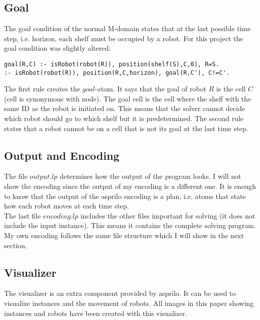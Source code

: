 \documentclass[runningheads]{llncs}
\begin{document}
\subsection{Goal}
The goal condition of the normal M-domain states that at the last possible time step, i.e. horizon, each shelf must be occupied by a robot. For this project the goal condition was slightly altered:
\begin{verbatim}
goal(R,C) :- isRobot(robot(R)), position(shelf(S),C,0), R=S.
:- isRobot(robot(R)), position(R,C,horizon), goal(R,C'), C!=C'.
\end{verbatim}
The first rule creates the $goal$-atom. It says that the goal of robot $R$ is the cell $C$ (cell is synonymous with node). The goal cell is the cell where the shelf with the same ID as the robot is initiated on. This means that the solver cannot decide which robot should go to which shelf but it is predetermined. The second rule states that a robot cannot be on a cell that is not its goal at the last time step.
\subsection{Output and Encoding}
The file $output.lp$ determines how the output of the program looks. I will not show the encoding since the output of my encoding is a different one. It is enough to know that the output of the asprilo encoding is a plan, i.e. atoms that state how each robot moves at each time step. \\
The last file $encoding.lp$ includes the other files important for solving (it does not include the input instance). This means it contains the complete solving program. My own encoding follows the same file structure which I will show in the next section.
\subsection{Visualizer}
The visualizer is an extra component provided by asprilo. It can be used to visualize instances and the movement of robots. All images in this paper showing instances and robots have been created with this visualizer.
\end{document}
